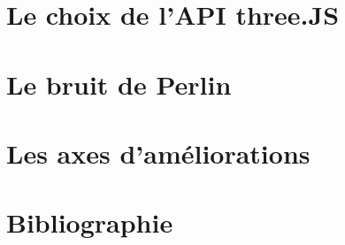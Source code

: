\documentclass[a4paper, 12pt]{report}
\begin{document}
\tableofcontents

\chapter*{Le choix de l'API three.JS}


\chapter*{Le bruit de Perlin}


\chapter*{Les axes d'améliorations}


\chapter*{Bibliographie}

\end{document}
